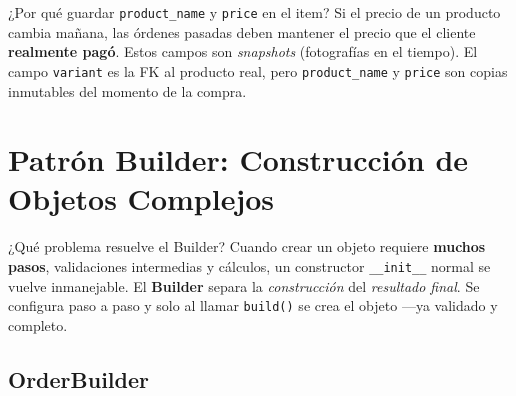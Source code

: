 \documentclass[12pt, a4paper]{article}
\begin{document}
\begin{warnbox}{¿Por qué guardar \texttt{product\_name} y \texttt{price} en el item?}
Si el precio de un producto cambia mañana, las órdenes pasadas deben mantener el
precio que el cliente \textbf{realmente pagó}. Estos campos son \textit{snapshots}
(fotografías en el tiempo). El campo \texttt{variant} es la FK al producto real,
pero \texttt{product\_name} y \texttt{price} son copias inmutables del momento
de la compra.
\end{warnbox}

\section{Patrón Builder: Construcción de Objetos Complejos}

\begin{conceptbox}{¿Qué problema resuelve el Builder?}
Cuando crear un objeto requiere \textbf{muchos pasos}, validaciones intermedias y
cálculos, un constructor \texttt{\_\_init\_\_} normal se vuelve inmanejable. El
\textbf{Builder} separa la \textit{construcción} del \textit{resultado final}.
Se configura paso a paso y solo al llamar \texttt{build()} se crea el objeto
—ya validado y completo.
\end{conceptbox}

\subsection{OrderBuilder}
\end{document}
